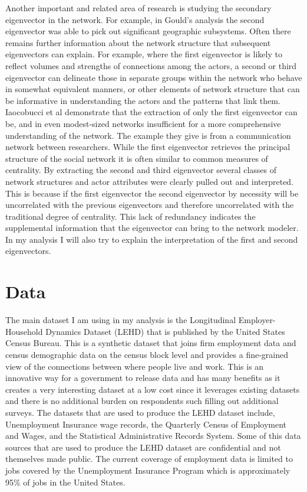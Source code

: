 \documentclass{article}
\theoremstyle{definition}
\theoremstyle{remark}
\begin{document}
Another important and related area of research is studying the secondary eigenvector in the network.  For example, in Gould’s analysis the second eigenvector was able to pick out significant geographic subsystems.  Often there remains further information about the network structure that subsequent eigenvectors can explain. For example, where the first eigenvector is likely to reflect volumes and strengths of connections among the actors, a second or third eigenvector can delineate those in separate groups within the network who behave in somewhat equivalent manners, or other elements of network structure that can be informative in understanding the actors and the patterns that link them. Iaocobucci et al demonstrate that the extraction of only the first eigenvector can be, and in even modest-sized networks insufficient for a more comprehensive understanding of the network.  The example they give is from a communication network between researchers.  While the first eigenvector retrieves the principal structure of the social network it is often similar to common measures of centrality.  By extracting the second and third eigenvector several classes of network structures and actor attributes were clearly pulled out and interpreted.  This is because if the first eigenvector the second eigenvector by necessity will be uncorrelated with the previous eigenvectors and therefore uncorrelated with the traditional degree of centrality.  This lack of redundancy indicates the supplemental information that the eigenvector can bring to the network modeler.  In my analysis I will also try to explain the interpretation of the first and second eigenvectors.

\section{Data}
The main dataset I am using in my analysis is the Longitudinal Employer-Household Dynamics Dataset (LEHD) that is published by the United States Census Bureau.  This is a synthetic dataset that joins firm employment data and census demographic data on the census block level and provides a fine-grained view of the connections between where people live and work.  This is an innovative way for a government to release data and has many benefits as it creates a very interesting dataset at a low cost since it leverages existing datasets and there is no additional burden on respondents such filling out additional surveys.  The datasets that are used to produce the LEHD dataset include, Unemployment Insurance wage records, the Quarterly Census of Employment and Wages, and the Statistical Administrative Records System.  Some of this data sources that are used to produce the LEHD dataset are confidential and not themselves made public.  The current coverage of employment data is limited to jobs covered by the Unemployment Insurance Program which is approximately 95\% of jobs in the United States.  \\
\end{document}
